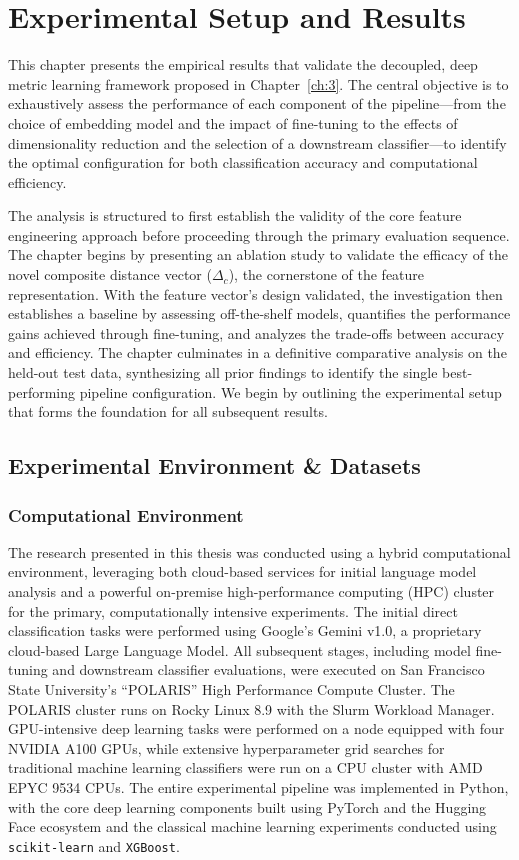 \chapter{Experimental Setup and Results}\label{ch:4}
This chapter presents the empirical results that validate the decoupled, deep metric learning framework proposed in Chapter~\ref{ch:3}. The central objective is to exhaustively assess the performance of each component of the pipeline---from the choice of embedding model and the impact of fine-tuning to the effects of dimensionality reduction and the selection of a downstream classifier---to identify the optimal configuration for both classification accuracy and computational efficiency.

The analysis is structured to first establish the validity of the core feature engineering approach before proceeding through the primary evaluation sequence. The chapter begins by presenting an ablation study to validate the efficacy of the novel composite distance vector (\(\Delta_c\)), the cornerstone of the feature representation. With the feature vector's design validated, the investigation then establishes a baseline by assessing off-the-shelf models, quantifies the performance gains achieved through fine-tuning, and analyzes the trade-offs between accuracy and efficiency. The chapter culminates in a definitive comparative analysis on the held-out test data, synthesizing all prior findings to identify the single best-performing pipeline configuration. We begin by outlining the experimental setup that forms the foundation for all subsequent results.

\section{Experimental Environment \& Datasets}\label{ch:4.1}

\subsection{Computational Environment}\label{ch:4.1.1}
The research presented in this thesis was conducted using a hybrid computational environment, leveraging both cloud-based services for initial language model analysis and a powerful on-premise high-performance computing (HPC) cluster for the primary, computationally intensive experiments. The initial direct classification tasks were performed using Google's Gemini v1.0, a proprietary cloud-based Large Language Model. All subsequent stages, including model fine-tuning and downstream classifier evaluations, were executed on San Francisco State University's ``POLARIS'' High Performance Compute Cluster. The POLARIS cluster runs on Rocky Linux 8.9 with the Slurm Workload Manager. GPU-intensive deep learning tasks were performed on a node equipped with four NVIDIA A100 GPUs, while extensive hyperparameter grid searches for traditional machine learning classifiers were run on a CPU cluster with AMD EPYC 9534 CPUs. The entire experimental pipeline was implemented in Python, with the core deep learning components built using PyTorch and the Hugging Face ecosystem and the classical machine learning experiments conducted using \verb|scikit-learn| and \verb|XGBoost|.

